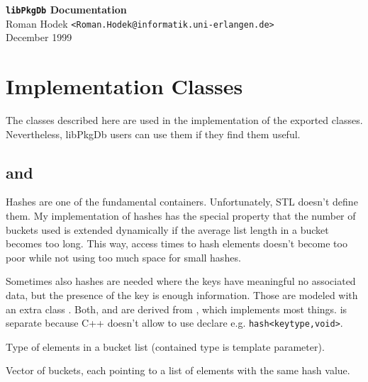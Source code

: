\documentclass[10pt]{article}
\begin{document}
\begin{center}
{\Large\bf
\texttt{libPkgDb} Documentation \\[\baselineskip]
}
{\large
Roman Hodek \texttt{<Roman.Hodek@informatik.uni-erlangen.de>} \\
December 1999
}
\end{center}
\vspace{1cm}

\tableofcontents
\newpage


\section{Implementation Classes}

The classes described here are used in the implementation of the
exported classes. Nevertheless, libPkgDb users can use them if they
find them useful.


\subsection{ and }

Hashes are one of the fundamental containers. Unfortunately, STL
doesn't define them. My implementation of hashes has the special
property that the number of buckets used is extended dynamically if
the average list length in a bucket becomes too long. This way, access
times to hash elements doesn't become too poor while not using too
much space for small hashes.

Sometimes also hashes are needed where the keys have meaningful no
associated data, but the presence of the key is enough information.
Those are modeled with an extra class . Both,
 and  are derived from
, which implements most things. 
is separate because C++ doesn't allow to use declare e.g.
\texttt{hash<keytype,void>}.

Type of elements in a bucket list (contained type is template parameter).

Vector of buckets, each pointing to a list of elements with the same
hash value.
\end{document}
